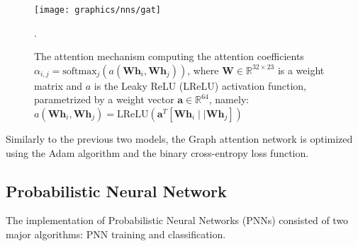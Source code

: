 	\begin{figure}[H]
		\centering
		\texttt{[image: graphics/nns/gat]}	
		\caption[Attention mechanism]{The attention mechanism computing the attention coefficients \\ $\alpha_{i,j}=\text{softmax}_j(a(\mathbf{Wh}_i, \mathbf{Wh}_j))$, where $\mathbf{W}\in\mathbb{R}^{32\times23}$ is a weight matrix and $a$ is the Leaky ReLU (LReLU) activation function, parametrized by a weight vector $\mathbf{a}\in\mathbb{R}^{64}$, namely: \\  $a(\mathbf{Wh}_i, \mathbf{Wh}_j)=\text{LReLU}(\mathbf{a}^T[\mathbf{Wh}_i\mid\mid\mathbf{Wh}_j])$}.
		\label{Fig: impl/ml/gat/attn-mechanism}
	\end{figure}
	Similarly to the previous two models, the Graph attention network is optimized using the Adam algorithm and the binary cross-entropy loss function. 
	\subsection{Probabilistic Neural Network} \label{Section: impl/ml/pnn}
	The implementation of Probabilistic Neural Networks (PNNs) consisted of two major algorithms: PNN training and classification.
